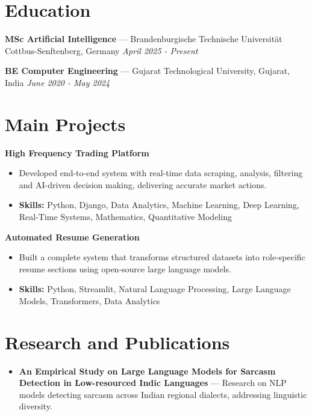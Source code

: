 \documentclass[a4paper,10pt]{article}
\begin{document}
\section*{Education}
\textbf{MSc Artificial Intelligence} — Brandenburgische Technische Universität Cottbus-Senftenberg, Germany \hfill \textit{April 2025 - Present}\par
\vspace{1.5pt}
\textbf{BE Computer Engineering} — Gujarat Technological University, Gujarat, India \hfill \textit{June 2020 - May 2024}\par

\section*{Main Projects}
\textbf{High Frequency Trading Platform}\par
\vspace{1pt}
\begin{itemize}
  \item Developed end-to-end system with real-time data scraping, analysis, filtering and AI-driven decision making, delivering accurate market actions.
  \item \textbf{Skills:} Python, Django, Data Analytics, Machine Learning, Deep Learning, Real-Time Systems, Mathematics, Quantitative Modeling
\end{itemize}
\vspace{3pt}
\textbf{Automated Resume Generation}\par
\vspace{1pt}
\begin{itemize}
  \item Built a complete system that transforms structured datasets into role-specific resume sections using open-source large language models.
  \item \textbf{Skills:} Python, Streamlit, Natural Language Processing, Large Language Models, Transformers, Data Analytics
\end{itemize}

\section*{Research and Publications}
\begin{itemize}
\item \textbf{An Empirical Study on Large Language Models for Sarcasm Detection in Low-resourced Indic Languages} — Research on NLP models detecting sarcasm across Indian regional dialects, addressing linguistic diversity.
\end{itemize}
\end{document}

